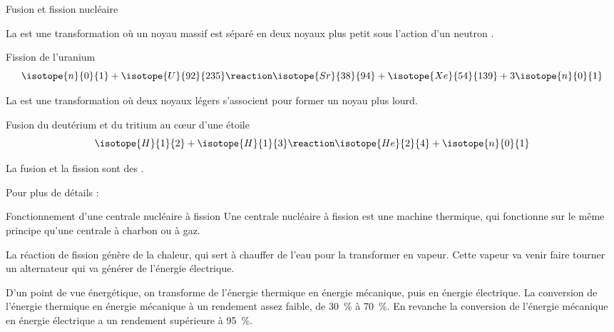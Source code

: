 \begin{doc}{Fusion et fission nucléaire}
  \begin{importants}
    La  est une transformation où un noyau massif est séparé en deux noyaux plus petit sous l'action d'un neutron .
  \end{importants}
  \exemple Fission de l'uranium 
  \begin{equation*} 
    \isotope{n}{0}{1} + \isotope{U}{92}{235} \reaction \isotope{Sr}{38}{94} + \isotope{Xe}{54}{139} + 3\isotope{n}{0}{1}
  \end{equation*}
  
  \begin{importants}
    La  est une transformation où deux noyaux légers s'associent pour former un noyau plus lourd.
  \end{importants}
  \exemple Fusion du deutérium et du tritium au c\oe{}ur d'une étoile
  \begin{equation*}
    \isotope{H}{1}{2} + \isotope{H}{1}{3} \reaction \isotope{He}{2}{4} + \isotope{n}{0}{1}
  \end{equation*}
  
  \phantom{b}\vspace*{-12pt}
  
  \begin{importants}
    La fusion et la fission sont des .
  \end{importants}

  Pour plus de détails :
\end{doc}

\begin{doc}{Fonctionnement d'une centrale nucléaire à fission}
  Une centrale nucléaire à fission est une machine thermique, qui fonctionne sur le même principe qu'une centrale à charbon ou à gaz.

  La réaction de fission génère de la chaleur, qui sert à chauffer de l'eau pour la transformer en vapeur.
  Cette vapeur va venir faire tourner un alternateur qui va générer de l'énergie électrique.
  \bigskip

  D'un point de vue énergétique, on transforme de l'énergie thermique en énergie mécanique, puis en énergie électrique.
  La conversion de l'énergie thermique en énergie mécanique à un rendement assez faible, de \qty{30}{\percent} à \qty{70}{\percent}.
  En revanche la conversion de l'énergie mécanique en énergie électrique a un rendement supérieure à \qty{95}{\percent}.
\end{doc}



